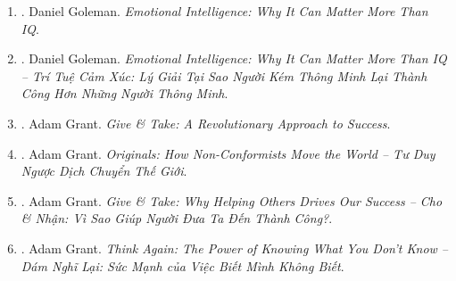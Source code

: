 \documentclass{article}
\begin{document}
\begin{enumerate}
\begin{itemize}
		\item ``{\sc David Goggins} is a rare breed of human being. His commitment to the philosophy of ``achieving your greatness by giving life all you got'' through mental toughness \& self discipline has been an anchor of inspiration \& motivation to millions around the world -- myself included. To me, what makes {\sc David} rare isn't his elite U.S. Navy SEAL career or his record-breaking endurance events as an athlete. What makes him rare is, from the day we connected, he's always been a real guy who shoots from the hip \& speaks from the heart. \& that's what matters most. Hardest workers in the room.'' -- {\sc Dwayne ``The Rock'' Johnson}
		\item ``I did not pick {\sc David} up when he fell, but he did pick me up every time I fell. {\sc David} has purposefully \& meticulously scrutinized every morbidly ugly aspect of our lives \& of his life with raw, brutal, \& oftentimes painful honesty. By sharing his life experiences, he has given all of us a blueprint on not only how to pick ourselves up but also how to excel in the face of overwhelming adversity \& ``stay hard'' in the process.'' -- {\sc Jacqueline Gardner, David}'s mom
	\end{itemize}

	\item \cite{Goleman_EQ}. {\sc Daniel Goleman}. {\it Emotional Intelligence: Why It Can Matter More Than IQ}. {}

	\item \cite{Goleman_EQ_VN}. {\sc Daniel Goleman}. {\it Emotional Intelligence: Why It Can Matter More Than IQ -- Trí Tuệ Cảm Xúc: Lý Giải Tại Sao Người Kém Thông Minh Lại Thành Công Hơn Những Người Thông Minh}.\hfill{\sf[done]}

	\item \cite{Grant_give_take}. {\sc Adam Grant}. {\it Give \& Take: A Revolutionary Approach to Success}.\hfill{\sf[reading]}

	\item \cite{Grant_original_VN}. {\sc Adam Grant}. {\it Originals: How Non-Conformists Move the World -- Tư Duy Ngược Dịch Chuyển Thế Giới}.\hfill{\sf[done]}

	\item \cite{Grant_give_take_VN}. {\sc Adam Grant}. {\it Give \& Take: Why Helping Others Drives Our Success -- Cho \& Nhận: Vì Sao Giúp Người Đưa Ta Đến Thành Công?}.\hfill{\sf[done]}

	\item \cite{Grant_think_again_VN}. {\sc Adam Grant}. {\it Think Again: The Power of Knowing What You Don't Know -- Dám Nghĩ Lại: Sức Mạnh của Việc Biết Mình Không Biết}.\hfill{\sf[done]}


\end{enumerate}
\end{document}
